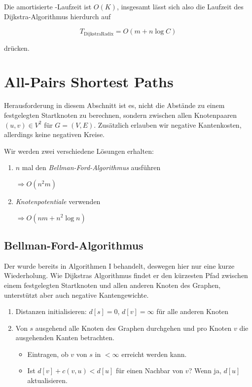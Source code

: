 Die amortisierte -Laufzeit ist \( O(K) \), insgesamt lässt sich also die Laufzeit des Dijkstra-Algorithmus hierdurch auf 

\begin{equation*}
  T_\text{DijkstraRadix} = O(m + n\log C)
\end{equation*}

drücken.

\section{All-Pairs Shortest Paths}

Herausforderung in diesem Abschnitt ist es, nicht die Abstände zu einem festgelegten Startknoten zu berechnen, sondern zwischen allen Knotenpaaren \( (u,v) \in V^2 \) für \( G = (V,E) \). Zusätzlich erlauben wir negative Kantenkosten, allerdings keine negativen Kreise.

Wir werden zwei verschiedene Lösungen erhalten:

\begin{enumerate}
  \item \( n \) mal den \emph{Bellman-Ford-Algorithmus} ausführen

  \( \Rightarrow O(n^2m) \)

  \item \emph{Knotenpotentiale} verwenden

  \( \Rightarrow O(nm + n^2\log n) \)
\end{enumerate}

\subsection{Bellman-Ford-Algorithmus}

Der  wurde bereits in Algorithmen I behandelt, deswegen hier nur eine kurze Wiederholung. Wie Dijkstras Algorithmus findet er den kürzesten Pfad zwischen einem festgelegten Startknoten und allen anderen Knoten des Graphen, unterstützt aber auch negative Kantengewichte.

\begin{enumerate}
  \item Distanzen initialisieren: \( d[s] = 0 \), \( d[v] = \infty \) für alle anderen Knoten
  \item Von \( s \) ausgehend alle Knoten des Graphen durchgehen und pro Knoten \( v \) die ausgehenden Kanten betrachten.
  \begin{itemize}
    \item Eintragen, ob \( v \) von \( s \) in \( < \infty \) erreicht werden kann.
    \item Ist \( d[v] + c(v,u) < d[u] \) für einen Nachbar von \( v \)? Wenn ja, \( d[u] \) aktualisieren.
  \end{itemize}
\end{enumerate}

